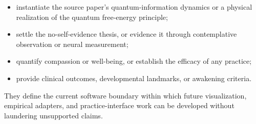 \documentclass[
]{article}
\providecommand{\tightlist}{%
  \setlength{\itemsep}{0pt}\setlength{\parskip}{0pt}}
\begin{document}
\begin{itemize}
\tightlist
\item
  instantiate the source paper's quantum-information dynamics or a
  physical realization of the quantum free-energy principle;
\item
  settle the no-self-evidence thesis, or evidence it through
  contemplative observation or neural measurement;
\item
  quantify compassion or well-being, or establish the efficacy of any
  practice;
\item
  provide clinical outcomes, developmental landmarks, or awakening
  criteria.
\end{itemize}

They define the current software boundary within which future
visualization, empirical adapters, and practice-interface work can be
developed without laundering unsupported claims.

\newpage



\clearpage


\end{document}
